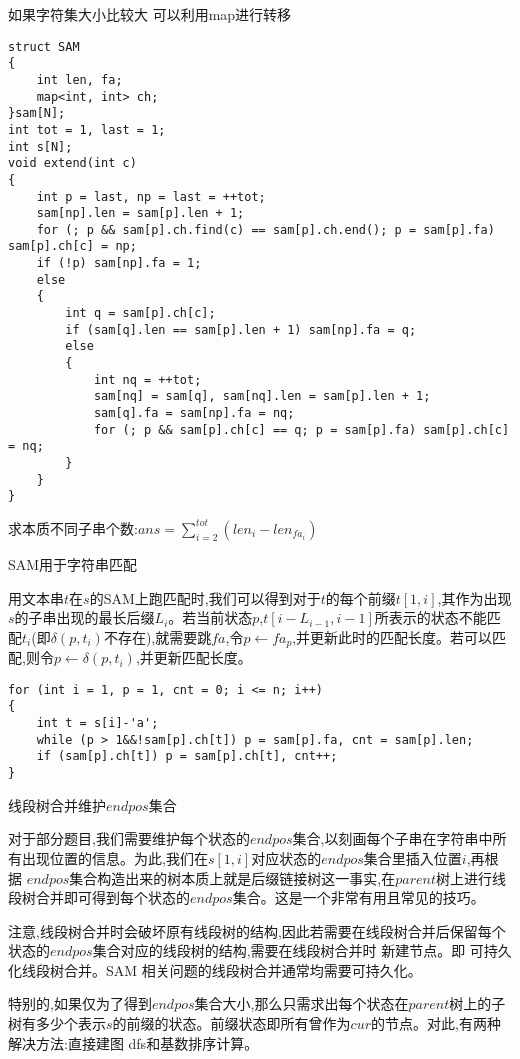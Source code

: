 \documentclass[a4paper,fontset=none]{ctexart}
\begin{document}
如果字符集大小比较大 可以利用map进行转移

\begin{verbatim}
struct SAM
{
    int len, fa;
    map<int, int> ch;
}sam[N];
int tot = 1, last = 1;
int s[N];
void extend(int c)
{
    int p = last, np = last = ++tot;
    sam[np].len = sam[p].len + 1;
    for (; p && sam[p].ch.find(c) == sam[p].ch.end(); p = sam[p].fa) sam[p].ch[c] = np;
    if (!p) sam[np].fa = 1;
    else
    {
        int q = sam[p].ch[c];
        if (sam[q].len == sam[p].len + 1) sam[np].fa = q;
        else
        {
            int nq = ++tot;
            sam[nq] = sam[q], sam[nq].len = sam[p].len + 1;
            sam[q].fa = sam[np].fa = nq;
            for (; p && sam[p].ch[c] == q; p = sam[p].fa) sam[p].ch[c] = nq;
        }
    }
}
\end{verbatim}

求本质不同子串个数:$ans=\sum\limits_{i=2}^{tot}(len_i-len_{fa_i})$

SAM用于字符串匹配

用文本串$t$在$s$的SAM上跑匹配时,我们可以得到对于$t$的每个前缀$t[1,i]$,其作为出现$s$的子串出现的最长后缀$L_i$。若当前状态$p$,$t[i-L_{i-1},i-1]$所表示的状态不能匹配$t_i$(即$\delta(p,t_i)$不存在),就需要跳$fa$,令$p\leftarrow fa_p$,并更新此时的匹配长度。若可以匹配,则令$p\leftarrow \delta(p,t_i)$,并更新匹配长度。

\begin{verbatim}
for (int i = 1, p = 1, cnt = 0; i <= n; i++)
{
    int t = s[i]-'a';
    while (p > 1&&!sam[p].ch[t]) p = sam[p].fa, cnt = sam[p].len;
    if (sam[p].ch[t]) p = sam[p].ch[t], cnt++;
}
\end{verbatim}

线段树合并维护$endpos$集合

对于部分题目,我们需要维护每个状态的$endpos$集合,以刻画每个子串在字符串中所有出现位置的信息。为此,我们在$s[1,i]$对应状态的$endpos$集合里插入位置$i$,再根据 $endpos$集合构造出来的树本质上就是后缀链接树这一事实,在$parent$树上进行线段树合并即可得到每个状态的$endpos$集合。这是一个非常有用且常见的技巧。

注意,线段树合并时会破坏原有线段树的结构,因此若需要在线段树合并后保留每个状态的$endpos$集合对应的线段树的结构,需要在线段树合并时 新建节点。即 可持久化线段树合并。SAM 相关问题的线段树合并通常均需要可持久化。

特别的,如果仅为了得到$endpos$集合大小,那么只需求出每个状态在$parent$树上的子树有多少个表示$s$的前缀的状态。前缀状态即所有曾作为$cur$的节点。对此,有两种解决方法:直接建图 dfs和基数排序计算。
\end{document}
